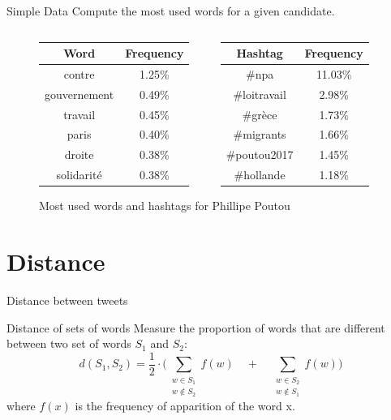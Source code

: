 \documentclass{beamer}
\begin{document}
\begin{frame}{Simple Data}
Compute the most used words for a given candidate.
\bigskip
\begin{figure}
\begin{columns}
\begin{column}{0.5\textwidth}
\begin{tabular}{ | c | c |}
\hline Word & Frequency\\
\hline
contre & 1.25\%\\
gouvernement & 0.49\%\\
travail & 0.45\%\\
paris & 0.40\%\\
droite & 0.38\%\\
solidarité &  0.38\%\\
\hline
\end{tabular}
\end{column}

\begin{column}{0.5\textwidth}
\begin{tabular}{ | c | c |}
\hline Hashtag & Frequency\\
\hline
\#npa & 11.03\%\\
\#loitravail & 2.98\%\\
\#grèce & 1.73\%\\
\#migrants & 1.66\%\\
\#poutou2017 & 1.45\%\\
\#hollande & 1.18\%\\
\hline
\end{tabular}
\end{column}
\end{columns}
\bigskip
\caption{Most used words and hashtags for Phillipe Poutou}
\end{figure}
\end{frame}


\section{Distance}
\begin{frame}{Distance between tweets}
\begin{block}{Distance of sets of words}
Measure the proportion of words that are different between two set of words $S_1$ and $S_2$:
\[
d(S_1, S_2)= \frac{1}{2} \cdot \Big( \sum_{\substack{w \in S_1\\w \notin S_2}}f(w) \quad + \quad \sum_{\substack{w \in S_2\\w \notin S_1}} f(w) \Big) 
\]
where $f(x)$ is the frequency of apparition of the word x.
\end{block}
\end{frame}
\end{document}
